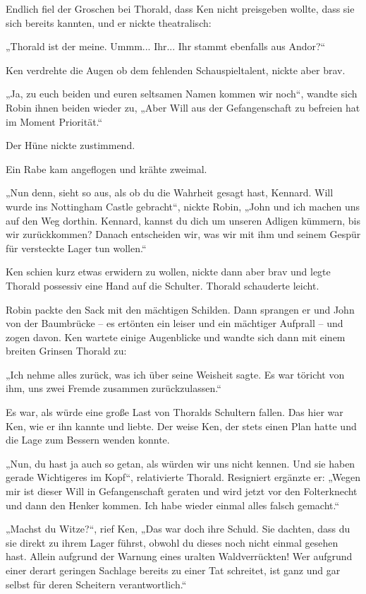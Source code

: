 \documentclass[10pt, a4paper, oneside]{book}
\begin{document}
Endlich fiel der Groschen bei Thorald, dass Ken nicht preisgeben wollte, dass sie sich bereits kannten, und er nickte theatralisch:

„Thorald ist der meine. Ummm... Ihr... Ihr stammt ebenfalls aus Andor?“

Ken verdrehte die Augen ob dem fehlenden Schauspieltalent, nickte aber brav.

„Ja, zu euch beiden und euren seltsamen Namen kommen wir noch“, wandte sich Robin ihnen beiden wieder zu, „Aber Will aus der Gefangenschaft zu befreien hat im Moment Priorität.“

Der Hüne nickte zustimmend.

Ein Rabe kam angeflogen und krähte zweimal.

„Nun denn, sieht so aus, als ob du die Wahrheit gesagt hast, Kennard. Will wurde ins Nottingham Castle gebracht“, nickte Robin, „John und ich machen uns auf den Weg dorthin. Kennard, kannst du dich um unseren Adligen kümmern, bis wir zurückkommen? Danach entscheiden wir, was wir mit ihm und seinem Gespür für versteckte Lager tun wollen.“

Ken schien kurz etwas erwidern zu wollen, nickte dann aber brav und legte Thorald possessiv eine Hand auf die Schulter. Thorald schauderte leicht.

Robin packte den Sack mit den mächtigen Schilden. Dann sprangen er und John von der Baumbrücke – es ertönten ein leiser und ein mächtiger Aufprall – und zogen davon. Ken wartete einige Augenblicke und wandte sich dann mit einem breiten Grinsen Thorald zu:

„Ich nehme alles zurück, was ich über seine Weisheit sagte. Es war töricht von ihm, uns zwei Fremde zusammen zurückzulassen.“

Es war, als würde eine große Last von Thoralds Schultern fallen. Das hier war Ken, wie er ihn kannte und liebte. Der weise Ken, der stets einen Plan hatte und die Lage zum Bessern wenden konnte.

„Nun, du hast ja auch so getan, als würden wir uns nicht kennen. Und sie haben gerade Wichtigeres im Kopf“, relativierte Thorald. Resigniert ergänzte er: „Wegen mir ist dieser Will in Gefangenschaft geraten und wird jetzt vor den Folterknecht und dann den Henker kommen. Ich habe wieder einmal alles falsch gemacht.“

„Machst du Witze?“, rief Ken, „Das war doch ihre Schuld. Sie dachten, dass du sie direkt zu ihrem Lager führst, obwohl du dieses noch nicht einmal gesehen hast. Allein aufgrund der Warnung eines uralten Waldverrückten! Wer aufgrund einer derart geringen Sachlage bereits zu einer Tat schreitet, ist ganz und gar selbst für deren Scheitern verantwortlich.“
\end{document}
